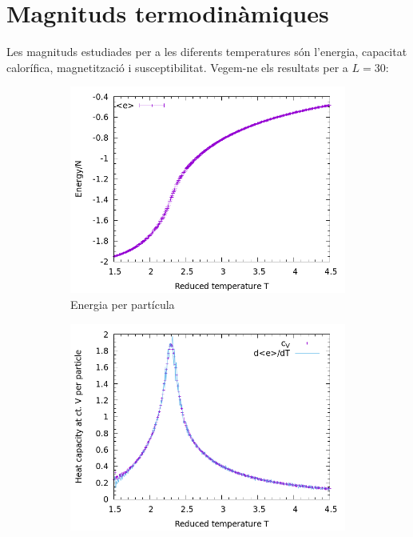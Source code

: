 \documentclass[a4paper]{article}
\begin{document}
\section{Magnituds termodinàmiques}

Les magnituds estudiades per a les diferents temperatures són l'energia, capacitat calorífica, magnetització i susceptibilitat. Vegem-ne els resultats per a $L=30$:

\begin{figure}[H]
    \centering
    \begin{subfigure}{.45\textwidth}
        \centering
        \includegraphics[width=\textwidth]{props-L-030_e.png}
        \caption{Energia per partícula}
        \label{fig:props-e}
    \end{subfigure}
    \begin{subfigure}{.45\textwidth}
        \centering
        \includegraphics[width=\textwidth]{props-L-030_cvn.png}

\end{subfigure}
\end{figure}
\end{document}
